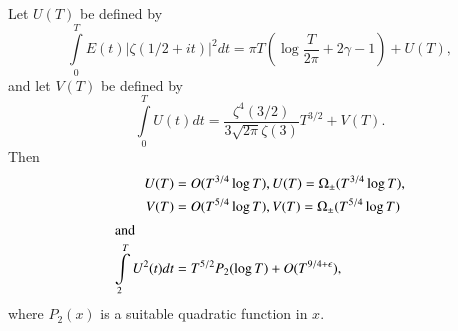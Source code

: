 \begin{thm}\label{c3:thm3.7}
Let $U(T)$ be defined by
  \begin{equation}
    \int\limits_0^T E(t) |\zeta (1/2 + it)|^2 dt = \pi T\left(\log
    \frac{T}{2 \pi} + 2 \gamma -1 \right)+ U(T),\label{c3:eq3.91}
  \end{equation}
  and let $V(T)$ be defined by 
  \begin{equation}
    \int\limits_0^TU(t) dt = \frac{\zeta^4 (3/2)}{3\sqrt{2 \pi} \zeta
      (3)} T^{3/2} + V(T).\label{c3:eq3.92}
  \end{equation}
  Then 
  \begin{align}
    U(T) & = O(T^{3/4} \log T), U(T) = \Omega_\pm (T^{3/4} \log
    T),\label{c3:eq3.93}\\ 
    V(T) & = O(T^{5/4} \log T), V(T) = \Omega_\pm (T^{5/4} \log
    T)\label{c3:eq3.94}\\
    \intertext{and}
    \int\limits_2^T U^2 (t) dt & = T^{5/2} P_2 (\log T)+ O(T^{9/4+
      \epsilon}),\label{c3:eq3.95}
  \end{align}
  where $P_2 (x)$ is a suitable quadratic function in $x$. 
\end{thm}

